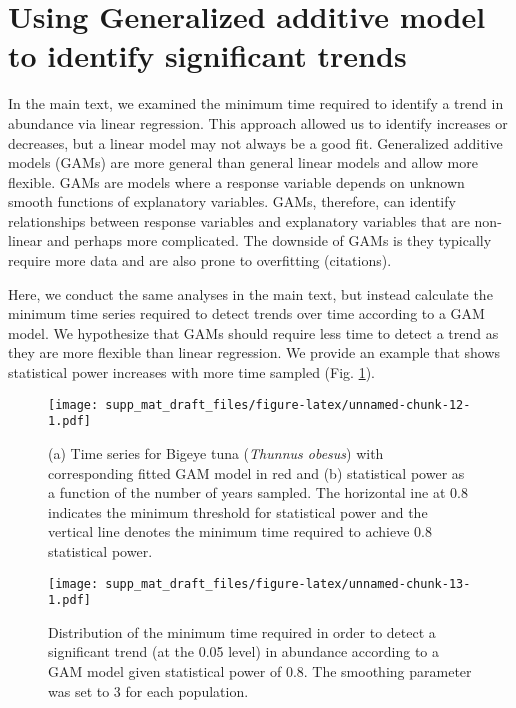 \documentclass[12pt,]{article}
\begin{document}
\clearpage 

\section{Using Generalized additive model to identify significant
trends}\label{using-generalized-additive-model-to-identify-significant-trends}

In the main text, we examined the minimum time required to identify a
trend in abundance via linear regression. This approach allowed us to
identify increases or decreases, but a linear model may not always be a
good fit. Generalized additive models (GAMs) are more general than
general linear models and allow more flexible. GAMs are models where a
response variable depends on unknown smooth functions of explanatory
variables. GAMs, therefore, can identify relationships between response
variables and explanatory variables that are non-linear and perhaps more
complicated. The downside of GAMs is they typically require more data
and are also prone to overfitting (citations).

Here, we conduct the same analyses in the main text, but instead
calculate the minimum time series required to detect trends over time
according to a GAM model. We hypothesize that GAMs should require less
time to detect a trend as they are more flexible than linear regression.
We provide an example that shows statistical power increases with more
time sampled (Fig. \ref{fig:gam_example}).

\begin{figure}[htbp]
\centering
\texttt{[image: supp\_mat\_draft\_files/figure-latex/unnamed-chunk-12-1.pdf]}
\caption{(a) Time series for Bigeye tuna (\emph{Thunnus obesus}) with
corresponding fitted GAM model in red and (b) statistical power as a
function of the number of years sampled. The horizontal ine at 0.8
indicates the minimum threshold for statistical power and the vertical
line denotes the minimum time required to achieve 0.8 statistical
power.\label{fig:gam_example}}
\end{figure}

\begin{figure}[htbp]
\centering
\texttt{[image: supp\_mat\_draft\_files/figure-latex/unnamed-chunk-13-1.pdf]}
\caption{Distribution of the minimum time required in order to detect a
significant trend (at the 0.05 level) in abundance according to a GAM
model given statistical power of 0.8. The smoothing parameter was set to
3 for each population.\label{fig:min_time_dist_gam}}
\end{figure}
\end{document}
